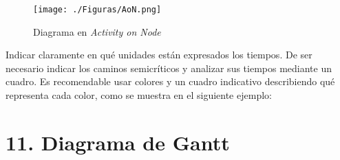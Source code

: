 \documentclass[
11pt, %
]{charter}
\begin{document}
\begin{figure}[htpb]
\centering 
\texttt{[image: ./Figuras/AoN.png]}
\caption{Diagrama en \textit{Activity on Node}}
\label{fig:AoN}
\end{figure}

Indicar claramente en qué unidades están expresados los tiempos.
De ser necesario indicar los caminos semicríticos y analizar sus tiempos mediante un cuadro.
Es recomendable usar colores y un cuadro indicativo describiendo qué representa cada color, como se muestra en el siguiente ejemplo:



\section{11. Diagrama de Gantt}
\label{sec:gantt}
\end{document}
